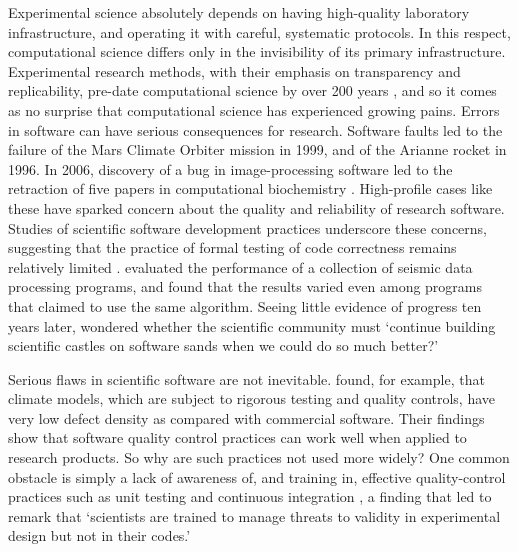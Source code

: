 \documentclass[12pt]{amsart}
\begin{document}
Experimental science absolutely depends on having high-quality laboratory infrastructure, and operating it with careful, systematic protocols. In this respect, computational science differs only in the invisibility of its primary infrastructure. Experimental research methods, with their emphasis on transparency and replicability, pre-date computational science by over 200 years \citep{wilson2006s,fomel2009reproducible}, and so it comes as no surprise that computational science has experienced growing pains. Errors in software can have serious consequences for research. Software faults led to the failure of the Mars Climate Orbiter mission in 1999, and of the Arianne rocket in 1996. In 2006, discovery of a bug in image-processing software led to the retraction of five papers in computational biochemistry \citep{miller2006scientist}. High-profile cases like these have sparked concern about the quality and reliability of research software. Studies of scientific software development practices underscore these concerns, suggesting that the practice of formal testing of code correctness remains relatively limited \citep{post2005computational,wilson2006s,hannay2009scientists,nguyen2010survey,clune2011software,howison2011scientific,prabhu2011survey,kanewala2014testing,heaton2015claims}. \citet{hatton1997t} evaluated the performance of a collection of seismic data processing programs, and found that the results varied even among programs that claimed to use the same algorithm. Seeing little evidence of progress ten years later, \citet{hatton2007chimera} wondered whether the scientific community must `continue building scientific castles on software sands when we could do so much better?'

Serious flaws in scientific software are not inevitable. \citet{pipitone2012assessing} found, for example, that climate models, which are subject to rigorous testing and quality controls, have very low defect density as compared with commercial software. Their findings show that software quality control practices can work well when applied to research products. So why are such practices not used more widely? One common obstacle is simply a lack of awareness of, and training in, effective quality-control practices such as unit testing and continuous integration \citep{wilson2006s,faulk2009scientific,hannay2009scientists,kanewala2014testing}, a finding that led \citet{faulk2009scientific} to remark that `scientists are trained to manage threats to validity in experimental design but not in their codes.'
\end{document}
